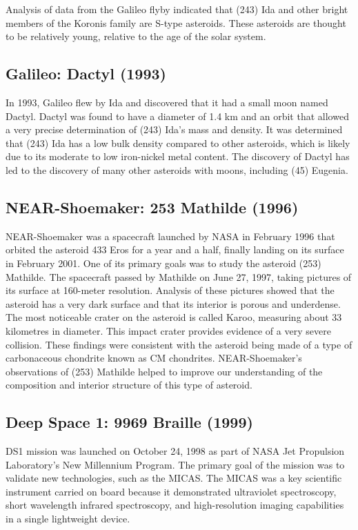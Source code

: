 Analysis of data from the Galileo flyby indicated that (243) Ida and other bright members of the Koronis family are S-type asteroids. These asteroids are thought to be relatively young, relative to the age of the solar system.

\subsection{Galileo: Dactyl (1993)}\label{ssec:dactyl}

In 1993, Galileo flew by Ida and discovered that it had a small moon named Dactyl. Dactyl was found to have a diameter of 1.4 km and an orbit that allowed a very precise determination of (243) Ida's mass and density. It was determined that (243) Ida has a low bulk density compared to other asteroids, which is likely due to its moderate to low iron-nickel metal content. The discovery of Dactyl has led to the discovery of many other asteroids with moons, including (45) Eugenia.

\subsection{NEAR-Shoemaker: 253 Mathilde (1996)}

NEAR-Shoemaker was a spacecraft launched by NASA in February 1996 that orbited the asteroid 433 Eros for a year and a half, finally landing on its surface in February 2001. One of its primary goals was to study the asteroid (253) Mathilde. The spacecraft passed by Mathilde on June 27, 1997, taking pictures of its surface at 160-meter resolution. Analysis of these pictures showed that the asteroid has a very dark surface and that its interior is porous and underdense. The most noticeable crater on the asteroid is called Karoo, measuring about 33 kilometres in diameter. This impact crater provides evidence of a very severe collision. These findings were consistent with the asteroid being made of a type of carbonaceous chondrite known as CM chondrites.  NEAR-Shoemaker's observations of (253) Mathilde helped to improve our understanding of the composition and interior structure of this type of asteroid.

\subsection{Deep Space 1: 9969 Braille (1999)}

\Gls{DS1} mission was launched on October 24, 1998 as part of \gls{NASA} Jet Propulsion Laboratory's New Millennium Program. The primary goal of the mission was to validate new technologies, such as the \gls{MICAS}. The \gls{MICAS} was a key scientific instrument carried on board because it demonstrated ultraviolet spectroscopy, short wavelength infrared spectroscopy, and high-resolution imaging capabilities in a single lightweight device. 

